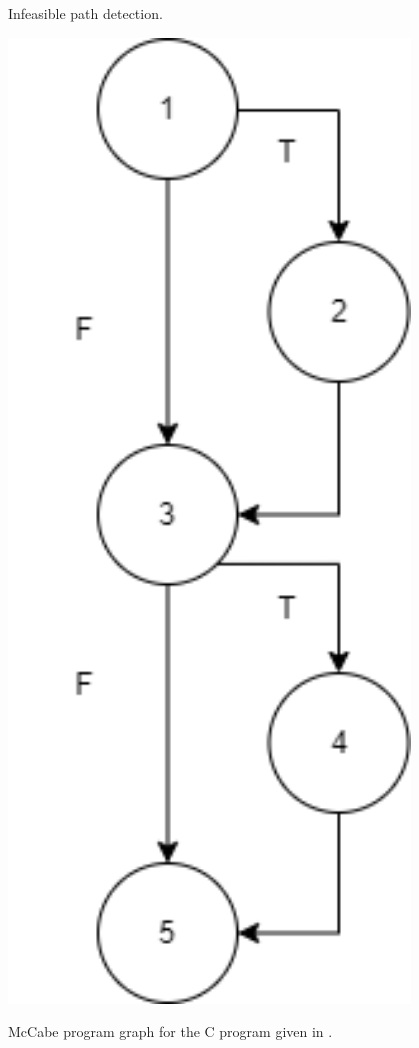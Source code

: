 \begin{algorithm}
\DontPrintSemicolon
{}
\caption{Infeasible path detection.}
\label{infeasible-algo}
\end{algorithm}

\begin{marginfigure}[-21cm]
    \includegraphics[width=0.8\textwidth]{images/cfg-35.png}
    \caption{McCabe program graph for the C program given in .}
\end{marginfigure}
